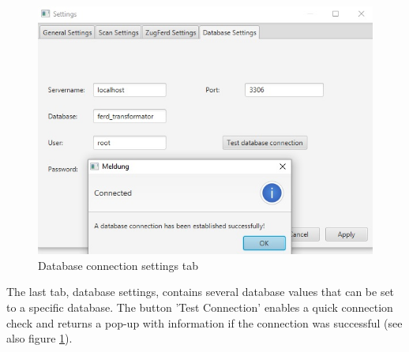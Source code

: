 \begin{figure}[ht!]
\centering
\includegraphics[scale=0.6]{Images/GUI/settings_Database.jpg}
\caption{Database connection settings tab \label{settings_Database}}
\end{figure}

The last tab, database settings, contains several database values that can be set to a specific database. The button 'Test Connection' enables a quick connection check and returns a pop-up with information if the connection was successful (see also figure \ref{settings_Database}). 
